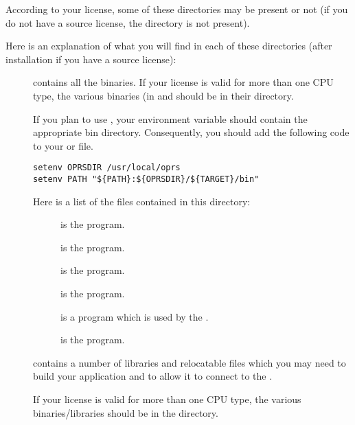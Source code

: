 According to your license, some of these directories may be present or not (if
you do not have a source license, the  directory is not present).

Here is an explanation of what you will find in each of these directories
(after installation if you have a source license):

\begin{description}

\item [] contains all the binaries. If your license is valid for more
than one CPU type, the various binaries (in  and  should be
in their  directory. 

If you plan to use \COPRSDE{}, your  environment variable should
contain the appropriate bin directory.  Consequently, you should add the
following code to your  or  file.

\begin{verbatim}
setenv OPRSDIR /usr/local/oprs
setenv PATH "${PATH}:${OPRSDIR}/${TARGET}/bin"
\end{verbatim}

Here is a list of the files contained in this directory:

\begin{description}

\item [] is the \CPK{} program.

\item [] is the \OPRSS{} program.

\item [] is the \XPK{} program.

\item [] is the \MPA{} program.

\item [] is a program which is used by the \XPK{}.

\item [] is the \OPE{} program.

\end{description}

\item [] contains a number of libraries and relocatable files which
you may need to build your application and to allow it to connect to the \MPA{}.

If your license is valid for more than one CPU type, the various
binaries/libraries should be in the  directory.


\end{description}
